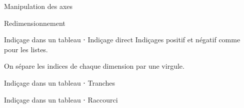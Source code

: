 \begin{frame}{Manipulation des axes}
\end{frame}

\begin{frame}{Redimensionnement}
\end{frame}

\begin{frame}{Indiçage dans un tableau ⋅ Indiçage direct}
  Indiçages positif et négatif comme pour les listes.

  On sépare les indices de chaque dimension par une virgule.

\end{frame}

\begin{frame}{Indiçage dans un tableau ⋅ Tranches}
\end{frame}

\begin{frame}{Indiçage dans un tableau ⋅ Raccourci}
\end{frame}


